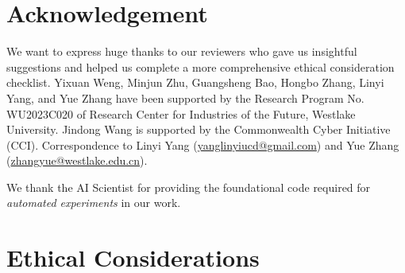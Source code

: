 \documentclass{article} %
\begin{document}





\section*{Acknowledgement}

We want to express huge thanks to our reviewers who gave us insightful suggestions and helped us complete a more comprehensive ethical consideration checklist. Yixuan Weng, Minjun Zhu, Guangsheng Bao, Hongbo Zhang, Linyi Yang, and Yue Zhang have been supported by the Research Program No. WU2023C020 of Research Center for Industries of the Future, Westlake University. Jindong Wang is supported by the Commonwealth Cyber Initiative (CCI). Correspondence to Linyi Yang (\url{yanglinyiucd@gmail.com}) and Yue Zhang (\url{zhangyue@westlake.edu.cn}).

We thank the AI Scientist \citep{lu2024ai} for providing the foundational code required for \textit{automated experiments} in our work.

\section*{Ethical Considerations}
\end{document}
